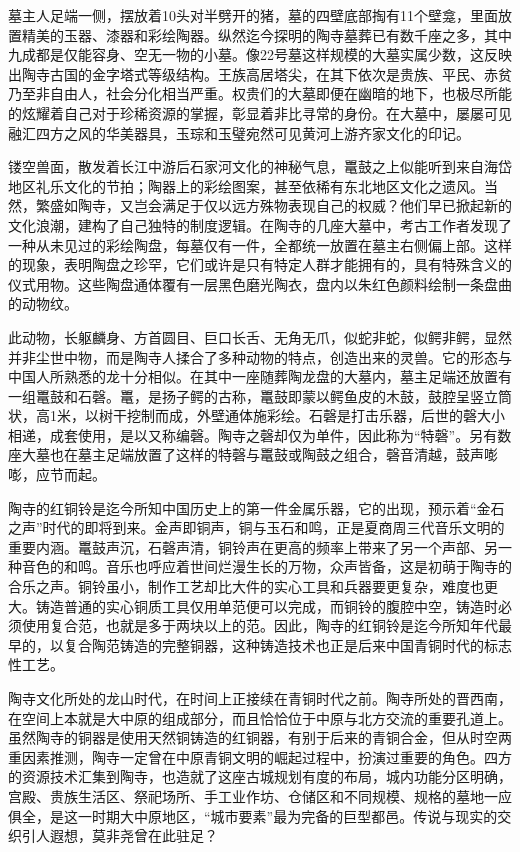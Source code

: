 墓主人足端一侧，摆放着10头对半劈开的猪，墓的四壁底部掏有11个壁龛，里面放置精美的玉器、漆器和彩绘陶器。纵然迄今探明的陶寺墓葬已有数千座之多，其中九成都是仅能容身、空无一物的小墓。像22号墓这样规模的大墓实属少数，这反映出陶寺古国的金字塔式等级结构。王族高居塔尖，在其下依次是贵族、平民、赤贫乃至非自由人，社会分化相当严重。权贵们的大墓即便在幽暗的地下，也极尽所能的炫耀着自己对于珍稀资源的掌握，彰显着非比寻常的身份。在大墓中，屡屡可见融汇四方之风的华美器具，玉琮和玉璧宛然可见黄河上游齐家文化的印记。

镂空兽面，散发着长江中游后石家河文化的神秘气息，鼍鼓之上似能听到来自海岱地区礼乐文化的节拍；陶器上的彩绘图案，甚至依稀有东北地区文化之遗风。当然，繁盛如陶寺，又岂会满足于仅以远方殊物表现自己的权威？他们早已掀起新的文化浪潮，建构了自己独特的制度逻辑。在陶寺的几座大墓中，考古工作者发现了一种从未见过的彩绘陶盘，每墓仅有一件，全都统一放置在墓主右侧偏上部。这样的现象，表明陶盘之珍罕，它们或许是只有特定人群才能拥有的，具有特殊含义的仪式用物。这些陶盘通体覆有一层黑色磨光陶衣，盘内以朱红色颜料绘制一条盘曲的动物纹。

此动物，长躯麟身、方首圆目、巨口长舌、无角无爪，似蛇非蛇，似鳄非鳄，显然并非尘世中物，而是陶寺人揉合了多种动物的特点，创造出来的灵兽。它的形态与中国人所熟悉的龙十分相似。在其中一座随葬陶龙盘的大墓内，墓主足端还放置有一组鼍鼓和石磬。鼍，是扬子鳄的古称，鼍鼓即蒙以鳄鱼皮的木鼓，鼓腔呈竖立筒状，高1米，以树干挖制而成，外壁通体施彩绘。石磬是打击乐器，后世的磬大小相递，成套使用，是以又称编磬。陶寺之磬却仅为单件，因此称为“特磬”。另有数座大墓也在墓主足端放置了这样的特磬与鼍鼓或陶鼓之组合，磬音清越，鼓声嘭嘭，应节而起。

陶寺的红铜铃是迄今所知中国历史上的第一件金属乐器，它的出现，预示着“金石之声”时代的即将到来。金声即铜声，铜与玉石和鸣，正是夏商周三代音乐文明的重要内涵。鼍鼓声沉，石磬声清，铜铃声在更高的频率上带来了另一个声部、另一种音色的和鸣。音乐也呼应着世间烂漫生长的万物，众声皆备，这是初萌于陶寺的合乐之声。铜铃虽小，制作工艺却比大件的实心工具和兵器要更复杂，难度也更大。铸造普通的实心铜质工具仅用单范便可以完成，而铜铃的腹腔中空，铸造时必须使用复合范，也就是多于两块以上的范。因此，陶寺的红铜铃是迄今所知年代最早的，以复合陶范铸造的完整铜器，这种铸造技术也正是后来中国青铜时代的标志性工艺。

陶寺文化所处的龙山时代，在时间上正接续在青铜时代之前。陶寺所处的晋西南，在空间上本就是大中原的组成部分，而且恰恰位于中原与北方交流的重要孔道上。虽然陶寺的铜器是使用天然铜铸造的红铜器，有别于后来的青铜合金，但从时空两重因素推测，陶寺一定曾在中原青铜文明的崛起过程中，扮演过重要的角色。四方的资源技术汇集到陶寺，也造就了这座古城规划有度的布局，城内功能分区明确，宫殿、贵族生活区、祭祀场所、手工业作坊、仓储区和不同规模、规格的墓地一应俱全，是这一时期大中原地区，“城市要素”最为完备的巨型都邑。传说与现实的交织引人遐想，莫非尧曾在此驻足？

